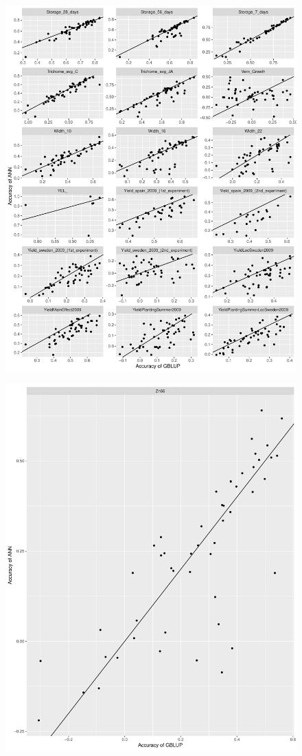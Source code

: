 \begin{figure}[H]
  \centering \includegraphics[height=1.05\textheight, width=1.1\textwidth]{Figures/cor_plots_7}
  \decoRule
 \label{fig:bla}
\end{figure}

\begin{figure}[H]
  \centering \includegraphics[height=.35\textheight, width=.65\textwidth]{Figures/cor_plots_8}
  \decoRule
 \label{fig:bla}
\end{figure}
